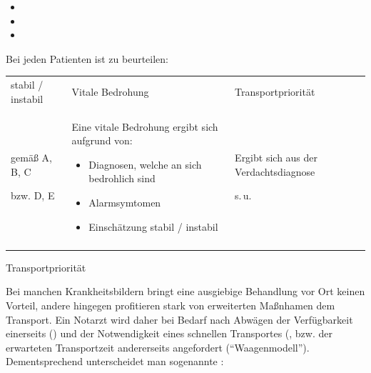 \begin{itemize}
  \item {}
  \item {}
  \item {}
\end{itemize}

\clearpage

Bei jeden Patienten ist zu beurteilen:

\begin{WidePar}

\begin{tabularx}{\linewidth}{XXX}
\toprule\addlinespace
stabil / instabil
&
Vitale Bedrohung
&
Transportpriorität
\\\addlinespace\midrule\addlinespace
gemäß A, B, C

bzw. D, E
&
Eine vitale Bedrohung ergibt sich aufgrund von:
\begin{itemize}
  \item Diagnosen, welche an sich bedrohlich sind
  \item Alarmsymtomen
  \item Einschätzung stabil / instabil
\end{itemize}
&
Ergibt sich aus der Verdachtsdiagnose

s.\,u.
\\\addlinespace\bottomrule
\end{tabularx}

\end{WidePar}

{Transportpriorität}
{Bei manchen Krankheitsbildern bringt eine ausgiebige
Behandlung vor Ort keinen Vorteil, andere hingegen
profitieren stark von erweiterten Maßnhamen  dem
Transport. Ein Notarzt wird daher bei Bedarf nach Abwägen
der Verfügbarkeit einerseits () und der Notwendigkeit
eines schnellen Transportes (, bzw.
der erwarteten Transportzeit andererseits angefordert
(\enquote{Waagenmodell}). 
Dementsprechend unterscheidet man
sogenannte :


}
{}
{}
{}
{}


